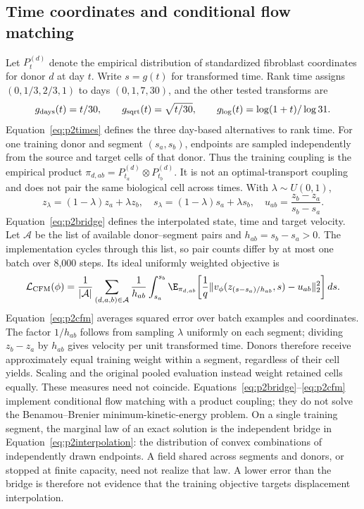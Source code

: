 \subsection{Time coordinates and conditional flow matching}
Let $P_t^{(d)}$ denote the empirical distribution of standardized fibroblast coordinates for donor $d$ at day $t$. Write $s=g(t)$ for transformed time. Rank time assigns $(0,1/3,2/3,1)$ to days $(0,1,7,30)$, and the other tested transforms are
\begin{equation}
g_{\rm days}(t)=t/30,\qquad
g_{\rm sqrt}(t)=\sqrt{t/30},\qquad
g_{\rm log}(t)=\log(1+t)/\log31.\label{eq:p2times}
\end{equation}
Equation~\eqref{eq:p2times} defines the three day-based alternatives to rank time. For one training donor and segment $(s_a,s_b)$, endpoints are sampled independently from the source and target cells of that donor. Thus the training coupling is the empirical product $\pi_{d,ab}=P_{t_a}^{(d)}\otimes P_{t_b}^{(d)}$. It is not an optimal-transport coupling and does not pair the same biological cell across times. With $\lambda\sim U(0,1)$,
\begin{equation}
z_\lambda=(1-\lambda)z_a+\lambda z_b,\quad
s_\lambda=(1-\lambda)s_a+\lambda s_b,\quad
u_{ab}=\frac{z_b-z_a}{s_b-s_a}.\label{eq:p2bridge}
\end{equation}
Equation~\eqref{eq:p2bridge} defines the interpolated state, time and target velocity. Let $\mathcal A$ be the list of available donor--segment pairs and $h_{ab}=s_b-s_a>0$. The implementation cycles through this list, so pair counts differ by at most one batch over 8,000 steps. Its ideal uniformly weighted objective is
\begin{equation}
\mathcal L_{\rm CFM}(\phi)=\frac1{|\mathcal A|}\sum_{(d,a,b)\in\mathcal A}\frac1{h_{ab}}
\int_{s_a}^{s_b}\E_{\pi_{d,ab}}\!\left[\frac1q\|v_\phi(z_{(s-s_a)/h_{ab}},s)-u_{ab}\|_2^2\right]ds.\label{eq:p2cfm}
\end{equation}
Equation~\eqref{eq:p2cfm} averages squared error over batch examples and coordinates. The factor $1/h_{ab}$ follows from sampling $\lambda$ uniformly on each segment; dividing $z_b-z_a$ by $h_{ab}$ gives velocity per unit transformed time. Donors therefore receive approximately equal training weight within a segment, regardless of their cell yields. Scaling and the original pooled evaluation instead weight retained cells equally. These measures need not coincide. Equations~\eqref{eq:p2bridge}--\eqref{eq:p2cfm} implement conditional flow matching with a product coupling; they do not solve the Benamou--Brenier minimum-kinetic-energy problem. On a single training segment, the marginal law of an exact solution is the independent bridge in Equation~\eqref{eq:p2interpolation}: the distribution of convex combinations of independently drawn endpoints. A field shared across segments and donors, or stopped at finite capacity, need not realize that law. A lower error than the bridge is therefore not evidence that the training objective targets displacement interpolation.

